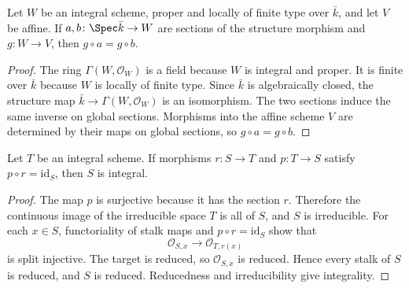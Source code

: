\begin{lemma}
  \label{lem:eq_comp_of_isAffine_of_properIntegral}
  \leanok
  Let \(W\) be an integral scheme, proper and locally of finite type over \(\bar k\),
  and let \(V\) be affine.  If \(a,b\colon\Spec\bar k\to W\) are sections of the
  structure morphism and \(g\colon W\to V\), then \(g\circ a=g\circ b\).
\end{lemma}
\begin{proof}
  \leanok
  The ring \(\Gamma(W,\mathcal O_W)\) is a field because \(W\) is integral and
  proper.  It is finite over \(\bar k\) because \(W\) is locally of finite type.
  Since \(\bar k\) is algebraically closed, the structure map
  \(\bar k\to\Gamma(W,\mathcal O_W)\) is an isomorphism.  The two sections induce
  the same inverse on global sections.  Morphisms into the affine scheme \(V\) are
  determined by their maps on global sections, so \(g\circ a=g\circ b\).
\end{proof}

\begin{lemma}
  \label{lem:isIntegral_of_retract_of_integral}
  \leanok
  Let \(T\) be an integral scheme.  If morphisms \(r\colon S\to T\) and
  \(p\colon T\to S\) satisfy \(p\circ r=\mathrm{id}_S\), then \(S\) is integral.
\end{lemma}
\begin{proof}
  \leanok
  The map \(p\) is surjective because it has the section \(r\).  Therefore the
  continuous image of the irreducible space \(T\) is all of \(S\), and \(S\) is
  irreducible.  For each \(x\in S\), functoriality of stalk maps and
  \(p\circ r=\mathrm{id}_S\) show that
  \[
    \mathcal O_{S,x}\longrightarrow\mathcal O_{T,r(x)}
  \]
  is split injective.  The target is reduced, so \(\mathcal O_{S,x}\) is reduced.
  Hence every stalk of \(S\) is reduced, and \(S\) is reduced.  Reducedness and
  irreducibility give integrality.
\end{proof}

